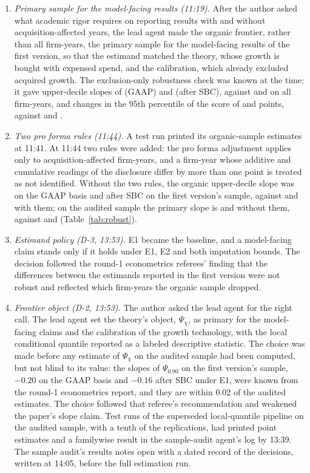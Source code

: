 \begin{enumerate}[leftmargin=*,itemsep=0pt,topsep=2pt]
\item \emph{Primary sample for the model-facing results (11:19).} After the author asked what academic rigor requires on reporting results with and without acquisition-affected years, the lead agent made the organic frontier, rather than all firm-years, the primary sample for the model-facing results of the first version, so that the estimand matched the theory, whose growth is bought with expensed spend, and the calibration, which already excluded acquired growth. The exclusion-only robustness check was known at the time: it gave upper-decile slopes of \KnownSlopeOpExcl{} (GAAP) and \KnownSlopeCashExcl{} (after SBC), against \KnownSlopeOpEone{} and \KnownSlopeCashEone{} on all firm-years, and changes in the 95th percentile of the score of \KnownTopOpExcl{} and \KnownTopCashExcl{} points, against \KnownTopOpEone{} and \KnownTopCashEone.
\item \emph{Two pro forma rules (11:44).} A test run printed its organic-sample estimates at 11:41. At 11:44 two rules were added: the pro forma adjustment applies only to acquisition-affected firm-years, and a firm-year whose additive and cumulative readings of the disclosure differ by more than one point is treated as not identified. Without the two rules, the organic upper-decile slope was \TestvTwoLocOp{} on the GAAP basis and \TestvTwoLocCash{} after SBC on the first version's sample, against \TestvTwoRefLocOp{} and \TestvTwoRefLocCash{} with them; on the audited sample the primary slope is \TestPsiOp{} and \TestPsiCash{} without them, against \TestRefPsiOp{} and \TestRefPsiCash{} (Table~\ref{tab:robust}).
\item \emph{Estimand policy (D-3, 13:53).} E1 became the baseline, and a model-facing claim stands only if it holds under E1, E2 and both imputation bounds. The decision followed the round-1 econometrics referees' finding that the differences between the estimands reported in the first version were not robust and reflected which firm-years the organic sample dropped.
\item \emph{Frontier object (D-2, 13:53).} The author asked the lead agent for the right call. The lead agent set the theory's object, $\Psi_\chi$, as primary for the model-facing claims and the calibration of the growth technology, with the local conditional quantile reported as a labeled descriptive statistic. The choice was made before any estimate of $\Psi_\chi$ on the audited sample had been computed, but not blind to its value: the slopes of $\Psi_{0.90}$ on the first version's sample, $-0.20$ on the GAAP basis and $-0.16$ after SBC under E1, were known from the round-1 econometrics report, and they are within 0.02 of the audited estimates. The choice followed that referee's recommendation and weakened the paper's slope claim. Test runs of the superseded local-quantile pipeline on the audited sample, with a tenth of the replications, had printed point estimates and a familywise result in the sample-audit agent's log by 13:39. The sample audit's results notes open with a dated record of the decisions, written at 14:05, before the full estimation run.

\end{enumerate}
